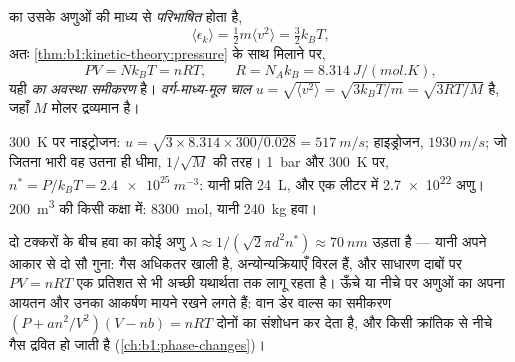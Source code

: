 \begin{definition}\label{def:b1:kinetic-theory:kinetictemp}
 का  उसके अणुओं की माध्य  से \emph{परिभाषित} होता
है,
\[
\langle\epsilon_k\rangle = \tfrac12 m\langle v^2\rangle = \tfrac32 k_BT ,
\]
अतः \cref{thm:b1:kinetic-theory:pressure} के साथ मिलाने पर,
\[
PV = Nk_BT = nRT, \qquad R = N_Ak_B = \qty{8.314}{J/(mol.K)} ,
\]
यही \emph{ का अवस्था समीकरण} है। \emph{वर्ग-माध्य-मूल चाल}
$u = \sqrt{\langle v^2\rangle} = \sqrt{3k_BT/m} = \sqrt{3RT/M}$ है, जहाँ
$M$ मोलर द्रव्यमान है।
\end{definition}

\begin{example}[हवा के आँकड़े]\label{ex:b1:kinetic-theory:air}
\qty{300}{K} पर नाइट्रोजन: $u = \sqrt{3 \times 8.314 \times 300/0.028} =
\qty{517}{m/s}$; हाइड्रोजन, $\qty{1930}{m/s}$; जो जितना भारी वह उतना ही
धीमा, $1/\sqrt M$ की तरह। \qty{1}{bar} और \qty{300}{K} पर, $n^* = P/k_BT = \qty{2.4e25}{m^{-3}}$:
यानी प्रति  \qty{24}{L}, और एक लीटर में \qty{2.7e22}{} अणु। \qty{200}{m^3}
की किसी कक्षा में: \qty{8300}{mol}, यानी \qty{240}{kg} हवा।
\end{example}

\begin{remark}[प्रतिरूप काम क्यों करता है, और कब विफल होता है]\label{rem:b1:kinetic-theory:validity}
दो टक्करों के बीच हवा का कोई अणु \emph{}
$\lambda \approx 1/(\sqrt2\pi d^2n^*) \approx \qty{70}{nm}$ उड़ता है --- यानी
अपने आकार से दो सौ गुना: गैस अधिकतर खाली है, अन्योन्यक्रियाएँ विरल हैं, और
साधारण दाबों पर $PV = nRT$ एक प्रतिशत से भी अच्छी यथार्थता तक लागू रहता
है। ऊँचे  या नीचे  पर अणुओं का अपना आयतन और उनका आकर्षण मायने रखने
लगते हैं: वान डेर वाल्स का समीकरण $(P + an^2/V^2)(V - nb) = nRT$
दोनों का संशोधन कर देता है, और किसी क्रांतिक  से नीचे गैस द्रवित हो
जाती है (\cref{ch:b1:phase-changes})।
\end{remark}

